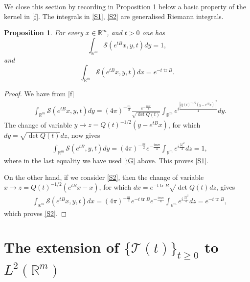\documentclass[11pt,a4paper]{amsart}
\newcommand{\Rm}{\mathbb R^m}
\numberwithin{equation}{section}
\newcommand{\tr}{\operatorname{tr}}
\newtheorem{proposition}[theorem]{Proposition}
\numberwithin{equation}{section}
\begin{document}
We close this section by recording in Proposition \ref{P:one} below a basic property of the kernel in \eqref{f}. The integrals in \eqref{S1}, \eqref{S2} are generalised Riemann integrals.


\begin{proposition}\label{P:one}
For every $x\in \Rm$, and $t>0$ one has 
\begin{equation}\label{S1}
\int_{\Rm} \mathcal S(e^{tB} x,y,t) dy = 1,
\end{equation}
and
\begin{equation}\label{S2}
\int_{\Rm} \mathcal S(e^{tB}x,y,t) dx = e^{-t \tr B}.
\end{equation}
\end{proposition}

\begin{proof}
We have from \eqref{f}
\begin{align*}
& \int_{\Rm} \mathcal S(e^{t B}x,y,t) dy = 
(4\pi
)^{-\frac{m}{2}} \frac{e^{-\frac{i m\pi}4}}{\sqrt{\det Q(t)}} \int_{\Rm}  e^{i \frac{|Q(t)^{-1/2}(y-e^{t B} x)|^2}{4}} dy.
\end{align*}
The change of variable $y\to z = Q(t)^{-1/2}(y-e^{t B} x)$, for which $dy = \sqrt{\det Q(t)} dz$, now gives
\begin{align*}
& \int_{\Rm} \mathcal S(e^{t B},y,t) dy = 
(4\pi)^{-\frac{m}{2}} e^{-\frac{i m\pi}4} \int_{\Rm}  e^{i \frac{|z|^2}{4}} dz  = 1,
\end{align*}
where in the last equality we have used \eqref{iG} above. This proves \eqref{S1}.

On the other hand, if we consider \eqref{S2}, then the change of variable $x\to z = Q(t)^{-1/2}(e^{t B} x-x)$, for which $dx = e^{-t \tr B} \sqrt{\det Q(t)} dz$, gives
\begin{align*}
& \int_{\Rm} \mathcal S(e^{t B}x,y,t) dx = (4\pi)^{-\frac{m}{2}} e^{-t \tr B} e^{-\frac{i m\pi}4} \int_{\Rm}  e^{i \frac{|z|^2}{4}} dz = e^{-t \tr B},
\end{align*}
which proves \eqref{S2}.

\end{proof}





\section{The extension of $\{\mathcal T(t)\}_{t\ge 0}$ to $L^2(\Rm)$}\label{S:sg}
\end{document}
